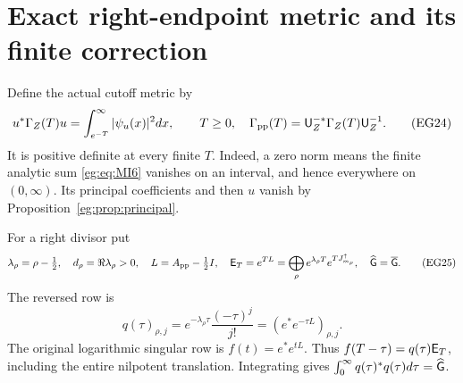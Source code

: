 \documentclass[11pt]{article}
\begin{document}
\section{Exact right-endpoint metric and its finite correction}\label{eg:sec:right-endpoint}
Define the actual cutoff metric by
\[
 u^*\Gamma_Z(T)u=\int_{e^{-T}}^\infty|\psi_u(x)|^2dx,
 \qquad T\ge0,\quad \Gamma_{\rm pp}(T)=\mathsf U_Z^{-*}\Gamma_Z(T)\mathsf U_Z^{-1}.
 \tag{EG24}\label{eg:eq:cutoff}
\]
It is positive definite at every finite $T$. Indeed, a zero norm
means the finite analytic sum \eqref{eg:eq:MI6} vanishes on an interval,
and hence everywhere on $(0,\infty)$. Its principal coefficients
and then $u$ vanish by Proposition~\ref{eg:prop:principal}.

For a right divisor put
\[
 \lambda_\rho=\rho-\tfrac12,\quad d_\rho=\Re\lambda_\rho>0,
 \quad L=A_{\rm pp}-\tfrac12I,\quad
 \mathsf E_T=e^{TL}=\bigoplus_\rho e^{\lambda_\rho T}e^{TJ^\uparrow_{m_\rho}},
 \quad\widehat{\mathsf G}=\overline{\mathsf G}.
 \tag{EG25}\label{eg:eq:E}
\]
The reversed row is
\[
 q(\tau)_{\rho,j}=e^{-\lambda_\rho\tau}\frac{(-\tau)^j}{j!}
                      = (e^*e^{-\tau L})_{\rho,j}.
 \tag{EG26}\label{eg:eq:q}
\]
The original logarithmic singular row is $f(t)=e^*e^{tL}$.
Thus $f(T-\tau)=q(\tau)\mathsf E_T$, including the entire nilpotent
translation. Integrating gives
$\int_0^\infty q(\tau)^*q(\tau)d\tau=\widehat{\mathsf G}$.
\end{document}
